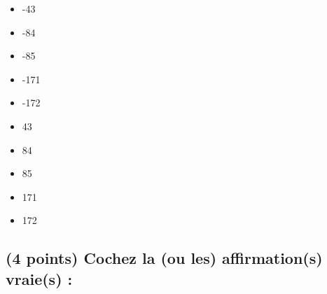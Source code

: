 \documentclass[11pt,a4paper]{article}
\begin{document}
\begin{table}[h!]
  \centering
  \begin{minipage}{0.45\textwidth}
\begin{itemize}
  \item[\CaseCoche] -43    \phantom{(} \\
  \item[\CaseCoche] -84    \phantom{(} \\  
  \item[\checkmark] -85    \phantom{(} \\ %
  \item[\CaseCoche] -171   \phantom{(} \\
  \item[\CaseCoche] -172   \phantom{(} \\
\end{itemize}
  \end{minipage}
  \hfillx
  \begin{minipage}{0.45\textwidth}
    \centering
\begin{itemize}
  \item[\CaseCoche] 43     \phantom{(} \\
  \item[\CaseCoche] 84     \phantom{(} \\
  \item[\CaseCoche] 85     \phantom{(} \\
  \item[\checkmark] 171    \phantom{(} \\ %
  \item[\CaseCoche] 172    \phantom{(} \\
\end{itemize}
  \end{minipage}
\end{table}


\bigskip


\subsection{(4 points) Cochez la (ou les) affirmation(s) vraie(s) : }
\end{document}
